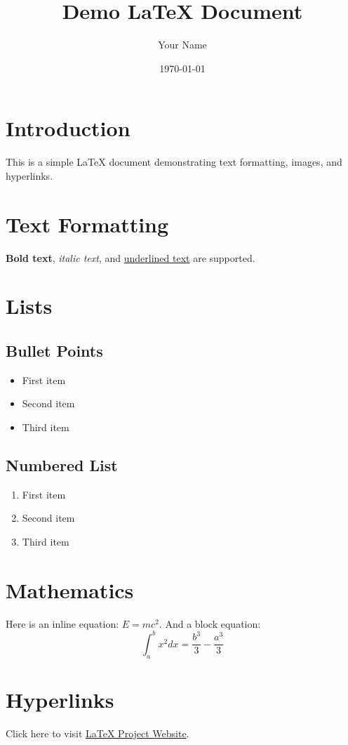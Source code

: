\documentclass[10pt, letterpaper]{article}
\title{\textbf{Demo LaTeX Document}}
\author{Your Name}
\date{\today}
\begin{document}
\maketitle

\section{Introduction}
This is a simple LaTeX document demonstrating text formatting, images, and hyperlinks.

\section{Text Formatting}
\textbf{Bold text}, \textit{italic text}, and \underline{underlined text} are supported.

\section{Lists}
\subsection{Bullet Points}
\begin{itemize}
    \item First item
    \item Second item
    \item Third item
\end{itemize}

\subsection{Numbered List}
\begin{enumerate}
    \item First item
    \item Second item
    \item Third item
\end{enumerate}

\section{Mathematics}
Here is an inline equation: \( E = mc^2 \).  
And a block equation:
\[
\int_a^b x^2 dx = \frac{b^3}{3} - \frac{a^3}{3}
\]


\section{Hyperlinks}
Click here to visit \href{https://www.latex-project.org/}{LaTeX Project Website}.
\end{document}
